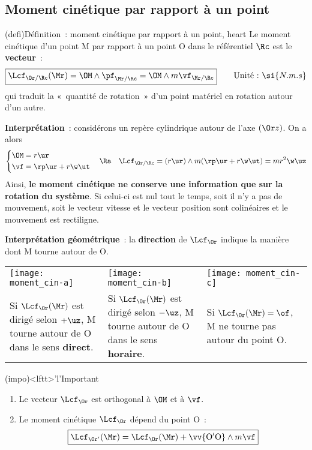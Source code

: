 \documentclass[../../main/main.tex]{subfiles}
\begin{document}
\subsection{Moment cinétique par rapport à un point}
\begin{tcb*}(defi){Définition~: moment cinétique par rapport à un point, heart}
	Le moment cinétique d'un point M par rapport à un point O dans le
	référentiel $\Rc$ est le \textbf{vecteur}~:
	\[
		\boxed{\Lcf_{\Or/\Rc}(\Mr) = \OM\wedge\pf_{\Mr/\Rc} = \OM\wedge
			m\vf_{\Mr/\Rc}}
		\qquad
		\text{Unité~:~}
		\si{N.m.s}
	\]
	qui traduit la «~quantité de rotation~» d'un point matériel en rotation
	autour d'un autre.
\end{tcb*}

\textbf{Interprétation}~: considérons un repère cylindrique autour de l'axe
$(\Or z)$. On a alors
\[
	\left\{
	\begin{aligned}
		\OM & = r\ur            \\
		\vf & = \rp\ur + r\w\ut
	\end{aligned}
	\right.
	\quad\Ra\quad
	\Lcf_{\Or/\Rc} = (r\ur)\wedge m(\rp\ur+r\w\ut) = mr^2\w\uz
\]
Ainsi, \textbf{le moment cinétique ne conserve une information que sur la
	rotation du système}. Si celui-ci est nul tout le temps, soit il n'y a pas de
mouvement, soit le vecteur vitesse et le vecteur position sont colinéaires et le
mouvement est rectiligne.

\textbf{Interprétation géométrique}~: la \textbf{direction} de $\Lcf_{\Or}$
indique la manière dont M tourne autour de O.
\begin{center}
	\begin{tabularx}{\linewidth}{YYY}
		\texttt{[image: moment\_cin-a]} &
		\texttt{[image: moment\_cin-b]} &
		\texttt{[image: moment\_cin-c]}
		\\
		Si $\Lcf_{\Or}(\Mr)$ est dirigé selon $+\uz$, M tourne autour de O dans
		le sens \textbf{direct}.                &
		Si $\Lcf_{\Or}(\Mr)$ est dirigé selon $-\uz$, M tourne autour de O dans
		le sens \textbf{horaire}.               &
		Si $\Lcf_{\Or}(\Mr) = \of$, M ne tourne pas autour du point O.
	\end{tabularx}
\end{center}

\begin{tcb*}(impo)<lftt>'l'{Important}
	\begin{enumerate}
		\item Le vecteur $\Lcf_{\Or}$ est orthogonal à $\OM$ et à $\vf$.
		\item Le moment cinétique $\Lcf_{\Or}$ dépend du point O~:
		      \[
			      \boxed{\Lcf_{\Or'}(\Mr) = \Lcf_{\Or}(\Mr) + \vv{\rm O'O}\wedge
				      m\vf}
		      \]
	\end{enumerate}
\end{tcb*}
\end{document}
